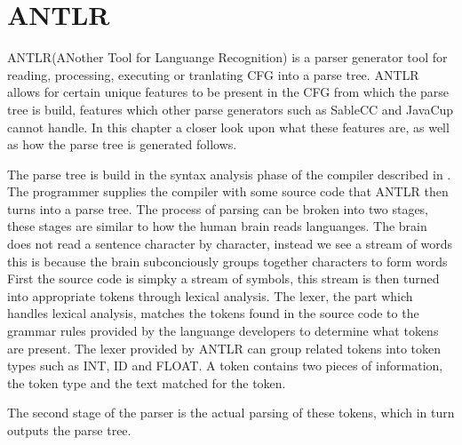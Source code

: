 \section{ANTLR}
ANTLR(ANother Tool for Languange Recognition) is a parser generator tool for reading, processing, executing or tranlating CFG into a parse tree.
ANTLR allows for certain unique features to be present in the CFG from which the parse tree is build, features which other parse generators such as SableCC and JavaCup cannot handle. 
In this chapter a closer look upon what these features are, as well as how the parse tree is generated follows.

The parse tree is build in the syntax analysis phase of the compiler described in .
The programmer supplies the compiler with some source code that ANTLR then turns into a parse tree.
The process of parsing can be broken into two stages, these stages are similar to how the human brain reads languanges.
The brain does not read a sentence character by character, instead we see a stream of words this is because the brain subconciously groups together characters to form words
First the source code is simpky a stream of symbols, this stream is then turned into appropriate tokens through lexical analysis.
The lexer, the part which handles lexical analysis, matches the tokens found in the source code to the grammar rules provided by the languange developers to determine what tokens are present.
The lexer provided by ANTLR can group related tokens into token types such as INT, ID and FLOAT.
A token contains two pieces of information, the token type and the text matched for the token. 

The second stage of the parser is the actual parsing of these tokens, which in turn outputs the parse tree.

